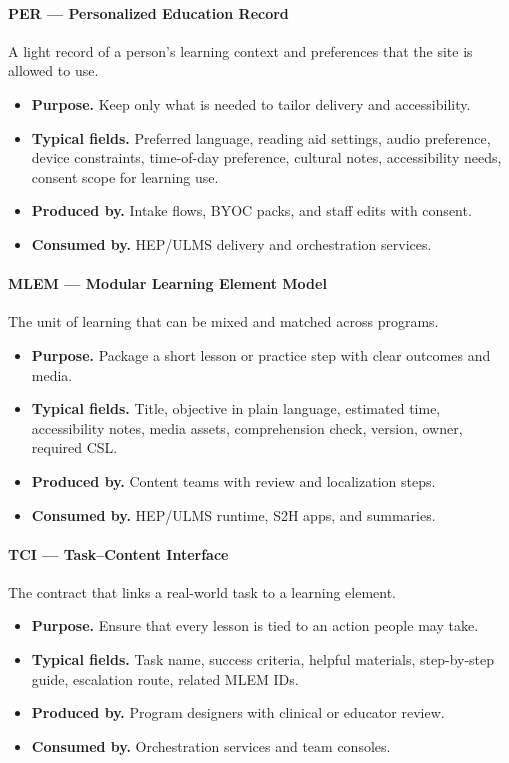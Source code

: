 \documentclass[12pt]{article}
\begin{document}
\paragraph{PER — Personalized Education Record}
A light record of a person’s learning context and preferences that the site is allowed to use.
\begin{itemize}[leftmargin=*]
  \item \textbf{Purpose.} Keep only what is needed to tailor delivery and accessibility.
  \item \textbf{Typical fields.} Preferred language, reading aid settings, audio preference, device constraints, time-of-day preference, cultural notes, accessibility needs, consent scope for learning use.
  \item \textbf{Produced by.} Intake flows, BYOC packs, and staff edits with consent.
  \item \textbf{Consumed by.} HEP/ULMS delivery and orchestration services.
\end{itemize}

\paragraph{MLEM — Modular Learning Element Model}
The unit of learning that can be mixed and matched across programs.
\begin{itemize}[leftmargin=*]
  \item \textbf{Purpose.} Package a short lesson or practice step with clear outcomes and media.
  \item \textbf{Typical fields.} Title, objective in plain language, estimated time, accessibility notes, media assets, comprehension check, version, owner, required CSL.
  \item \textbf{Produced by.} Content teams with review and localization steps.
  \item \textbf{Consumed by.} HEP/ULMS runtime, S2H apps, and summaries.
\end{itemize}

\paragraph{TCI — Task–Content Interface}
The contract that links a real-world task to a learning element.
\begin{itemize}[leftmargin=*]
  \item \textbf{Purpose.} Ensure that every lesson is tied to an action people may take.
  \item \textbf{Typical fields.} Task name, success criteria, helpful materials, step-by-step guide, escalation route, related MLEM IDs.
  \item \textbf{Produced by.} Program designers with clinical or educator review.
  \item \textbf{Consumed by.} Orchestration services and team consoles.
\end{itemize}
\end{document}
